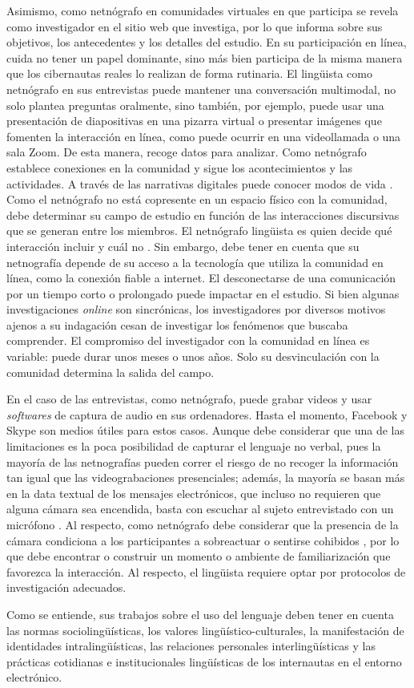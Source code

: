 Asimismo, como netnógrafo en comunidades virtuales en que participa se
revela como investigador en el sitio web que investiga, por lo que
informa sobre sus objetivos, los antecedentes y los detalles del
estudio. En su participación en línea, cuida no tener un papel
dominante, sino más bien participa de la misma manera que los
cibernautas reales lo realizan de forma rutinaria. El lingüista como
netnógrafo en sus entrevistas puede mantener una conversación
multimodal, no solo plantea preguntas oralmente, sino también, por
ejemplo, puede usar una presentación de diapositivas en una pizarra
virtual o presentar imágenes que fomenten la interacción en línea, como
puede ocurrir en una videollamada o una sala Zoom. De esta manera,
recoge datos para analizar. Como netnógrafo establece conexiones en la
comunidad y sigue los acontecimientos y las actividades. A través de las
narrativas digitales puede conocer modos de vida \textcite{londoñopalacio2012}. Como
el netnógrafo no está copresente en un espacio físico con la comunidad,
debe determinar su campo de estudio en función de las interacciones
discursivas que se generan entre los miembros. El netnógrafo lingüista
es quien decide qué interacción incluir y cuál no \cite{kulavuz-onal2015}.
Sin embargo, debe tener en cuenta que su netnografía depende de su
acceso a la tecnología que utiliza la comunidad en línea, como la
conexión fiable a internet. El desconectarse de una comunicación por un
tiempo corto o prolongado puede impactar en el estudio. Si bien algunas
investigaciones \emph{online} son sincrónicas, los investigadores por
diversos motivos ajenos a su indagación cesan de investigar los
fenómenos que buscaba comprender. El compromiso del investigador con la
comunidad en línea es variable: puede durar unos meses o unos años. Solo
su desvinculación con la comunidad determina la salida del campo.

En el caso de las entrevistas, como netnógrafo, puede grabar videos y
usar \emph{softwares} de captura de audio en sus ordenadores. Hasta el
momento, Facebook y Skype son medios útiles para estos casos. Aunque
debe considerar que una de las limitaciones es la poca posibilidad de
capturar el lenguaje no verbal, pues la mayoría de las netnografías
pueden correr el riesgo de no recoger la información tan igual que las
videograbaciones presenciales; además, la mayoría se basan más en la
data textual de los mensajes electrónicos, que incluso no requieren que
alguna cámara sea encendida, basta con escuchar al sujeto entrevistado
con un micrófono \cite{noveli2010}. Al respecto, como netnógrafo debe
considerar que la presencia de la cámara condiciona a los participantes
a sobreactuar o sentirse cohibidos \cite[p. 116]{boellstorff2012ethnography}, por lo que debe encontrar o construir un momento o ambiente de
familiarización que favorezca la interacción. Al respecto, el lingüista
requiere optar por protocolos de investigación adecuados.

Como se entiende, sus trabajos sobre el uso del lenguaje deben tener en
cuenta las normas sociolingüísticas, los valores lingüístico-culturales,
la manifestación de identidades intralingüísticas, las relaciones
personales interlingüísticas y las prácticas cotidianas e
institucionales lingüísticas de los internautas en el entorno
electrónico.